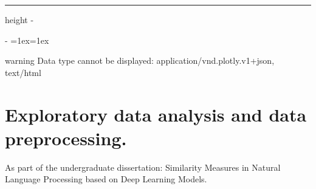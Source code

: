 \documentclass[letterpaper,10pt,english]{sphinxmanual}
\makeatletter
\newenvironment{nbsphinxfancyoutput}{%
    \let\sphinxincludegraphics\nbsphinxincludegraphics
    \nbsphinx@image@maxheight\textheight
    \advance\nbsphinx@image@maxheight -2\fboxsep   %
    \advance\nbsphinx@image@maxheight -2\fboxrule  %
    \advance\nbsphinx@image@maxheight -\baselineskip
\def\nbsphinxfcolorbox{\spx@fcolorbox{nbsphinx-code-border}{white}}%
\def\FrameCommand{\nbsphinxfcolorbox\nbsphinxfancyaddprompt\@empty}%
\def\FirstFrameCommand{\nbsphinxfcolorbox\nbsphinxfancyaddprompt\sphinxVerbatim@Continues}%
\def\MidFrameCommand{\nbsphinxfcolorbox\sphinxVerbatim@Continued\sphinxVerbatim@Continues}%
\def\LastFrameCommand{\nbsphinxfcolorbox\sphinxVerbatim@Continued\@empty}%
\MakeFramed{\advance\hsize-\width\@totalleftmargin\z@\linewidth\hsize\@setminipage}%
\lineskip=1ex\lineskiplimit=1ex\raggedright%
}{\par\unskip\@minipagefalse\endMakeFramed}
\def\nbsphinxfancyaddprompt{\ifvoid\nbsphinxpromptbox\else
    \kern\fboxrule\kern\fboxsep
    \copy\nbsphinxpromptbox
    \kern-\ht\nbsphinxpromptbox\kern-\dp\nbsphinxpromptbox
    \kern-\fboxsep\kern-\fboxrule\nointerlineskip
    \fi}
\newlength\nbsphinxcodecellspacing
\newcommand*{\nbsphinxincludegraphics}[2][]{%
    \gdef\spx@includegraphics@options{#1}%
    \setbox\spx@image@box\hbox{\texttt{[image: \#2]}}%
    \in@false
    \ifdim \wd\spx@image@box>\linewidth
      \g@addto@macro\spx@includegraphics@options{,width=\linewidth}%
      \in@true
    \fi
    \ifdim \ht\spx@image@box>\nbsphinx@image@maxheight
      \g@addto@macro\spx@includegraphics@options{,height=\nbsphinx@image@maxheight}%
      \in@true
    \fi
    \ifin@
      \g@addto@macro\spx@includegraphics@options{,keepaspectratio}%
    \fi
    \setbox\spx@image@box\box\voidb@x %
    \expandafter\includegraphics\expandafter[\spx@includegraphics@options]{#2}%
}%
\makeatother
\begin{document}
{
\begin{sphinxVerbatim}[commandchars=\\\{\}]
\llap{\color{nbsphinxin}[9]:\,\hspace{\fboxrule}\hspace{\fboxsep}}
\end{sphinxVerbatim}
}

\hrule height -\fboxrule\relax
\vspace{\nbsphinxcodecellspacing}

\makeatletter\setbox\nbsphinxpromptbox\box\voidb@x\makeatother

\begin{nbsphinxfancyoutput}

\begin{sphinxadmonition}{warning}{}\unskip
Data type cannot be displayed: application/vnd.plotly.v1+json, text/html
\end{sphinxadmonition}

\end{nbsphinxfancyoutput}




\chapter{Exploratory data analysis and data preprocessing.}
\label{\detokenize{Data preprocessing:Exploratory-data-analysis-and-data-preprocessing.}}\label{\detokenize{Data preprocessing::doc}}


As part of the undergraduate dissertation: Similarity Measures in Natural Language Processing based on Deep Learning Models.
\end{document}
